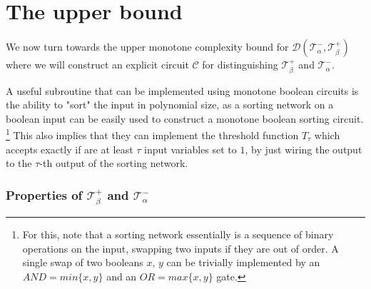 \documentclass[10pt,a4paper]{article}
\newtheorem{lemma}[theorem]{Lemma}
\newcommand{\jnote}[1]{\todo[inline,backgroundcolor=blue!20!green]{#1 \\ \textsc{--Jarek}}}
\newcommand{\lnote}[1]{\todo[inline,backgroundcolor=blue!20!yellow]{#1 \\ \textsc{--Linus}}}
\begin{document}
\section{The upper bound}

We now turn towards the upper monotone complexity bound for $\mathcal{D}(\mathcal{T}^-_\alpha, \mathcal{T}^+_\beta)$ where we will construct an explicit circuit $\mathcal{C}$ for distinguishing  $\mathcal{T}^+_\beta$ and $\mathcal{T}^-_\alpha$.

A useful subroutine that can be implemented using monotone boolean circuits is the ability to "sort" the input in polynomial size, as a sorting network on a boolean input can be easily used to construct a monotone boolean sorting circuit. \footnote{For this, note that a sorting network essentially is a sequence of binary operations on the input, swapping two inputs if they are out of order. A single swap of two booleans $x$, $y$ can be trivially implemented by an $AND = min\{x, y\}$ and an $OR = max\{x, y\}$ gate.} This also implies that they can implement the threshold function $T_\tau$ which accepts exactly if are at least $\tau$ input variables set to $1$, by just wiring the output to the $\tau$-th output of the sorting network.

\subsubsection*{Properties of $\mathcal{T}^+_\beta$ and $\mathcal{T}^-_\alpha$}
\end{document}
